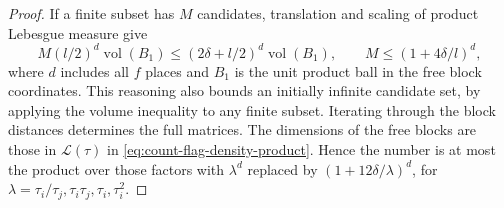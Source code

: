 \begin{proof}
If a finite subset has \(M\) candidates, translation and scaling
of product Lebesgue measure give
\[
 M(l/2)^d\operatorname{vol}(B_1)
       \le(2\delta+l/2)^d\operatorname{vol}(B_1),\qquad
 M\le(1+4\delta/l)^d ,
\]
where \(d\) includes all \(f\) places and \(B_1\) is the unit
product ball in the free block coordinates. This reasoning also
bounds an initially infinite candidate set, by applying the
volume inequality to any finite subset. Iterating through
the block distances determines the full matrices. The
dimensions of the free blocks are those in
\(\mathcal L(\tau)\) in \eqref{eq:count-flag-density-product}. Hence the number is at most
the product over those factors with \(\lambda^d\)
replaced by \((1+12\delta/\lambda)^d\), for
\(\lambda=\tau_i/\tau_j,\tau_i\tau_j,\tau_i,\tau_i^2\).
\end{proof}
